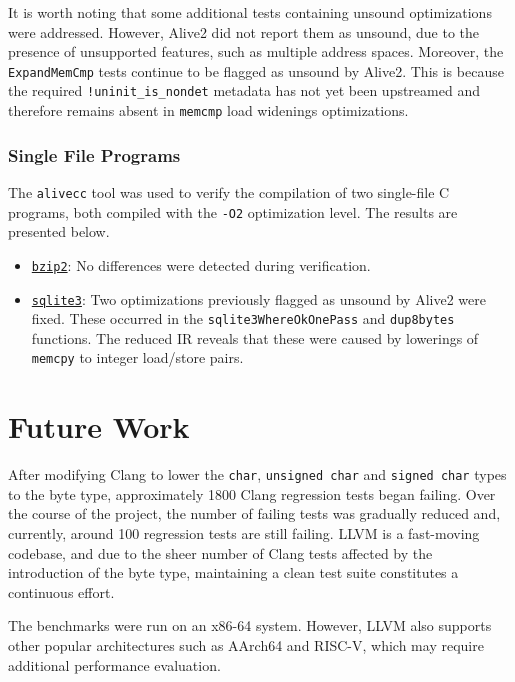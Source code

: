 \documentclass[a4paper,12pt]{article}
\begin{document}
It is worth noting that some additional tests containing unsound optimizations were addressed.
However, Alive2 did not report them as unsound, due to the presence of unsupported features, such as multiple address spaces.
Moreover, the \texttt{ExpandMemCmp} tests continue to be flagged as unsound by Alive2.
This is because the required \texttt{!uninit\_is\_nondet} metadata has not yet been upstreamed and therefore remains absent in \texttt{memcmp} load widenings optimizations.

\subsubsection{Single File Programs}

The \texttt{alivecc} tool was used to verify the compilation of two single-file C programs, both compiled with the \texttt{-O2} optimization level.
The results are presented below.

\begin{itemize}
  \item \href{https://people.csail.mit.edu/smcc/projects/single-file-programs/bzip2.c}{\texttt{bzip2}}: No differences were detected during verification.
  \item \href{https://raw.githubusercontent.com/azadkuh/sqlite-amalgamation/refs/heads/master/sqlite3.c}{\texttt{sqlite3}}:
  Two optimizations previously flagged as unsound by Alive2 were fixed.
  These occurred in the \texttt{sqlite3WhereOkOnePass} and \texttt{dup8bytes} functions.
  The reduced IR reveals that these were caused by lowerings of \texttt{memcpy} to integer load/store pairs.
\end{itemize}

\section{Future Work}

After modifying Clang to lower the \texttt{char}, \texttt{unsigned char} and \texttt{signed char} types to the byte type, approximately 1800 Clang regression tests began failing.
Over the course of the project, the number of failing tests was gradually reduced and, currently, around 100 regression tests are still failing.
LLVM is a fast-moving codebase, and due to the sheer number of Clang tests affected by the introduction of the byte type, maintaining a clean test suite constitutes a continuous effort.

The benchmarks were run on an x86-64 system.
However, LLVM also supports other popular architectures such as AArch64 and RISC-V, which may require additional performance evaluation.
\end{document}
